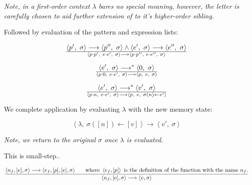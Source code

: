 \emph{Note, in a first-order context $\lambda$ bares no special meaning,
however, the letter is carefully chosen to aid further extension of  to
it's higher-order sibling.}

Followed by evaluation of the pattern and expression lists:

\begin{equation}
{
\left\langle p',\ \sigma\right\rangle
\longrightarrow
\left\langle p'',\ \sigma\right\rangle
\wedge
\left\langle e',\ \sigma\right\rangle
\longrightarrow
\left\langle e'',\ \sigma\right\rangle
}\over{
\left\langle p\cdot p',\ e\cdot e',\ \sigma\right\rangle
\longrightarrow
\left\langle p\cdot p'',\ e\cdot e'',\ \sigma\right\rangle
}
\end{equation}

\begin{equation}
{
\left\langle e',\ \sigma\right\rangle
\longrightarrow^*
\left\langle 0,\ \sigma\right\rangle
}\over{
\left\langle p\cdot 0,\ e\cdot e',\ \sigma\right\rangle
\longrightarrow
\left\langle p,\ e,\ \sigma\right\rangle
}
\end{equation}

\begin{equation}
{
\left\langle e',\ \sigma\right\rangle
\longrightarrow^*
\left\langle v',\ \sigma\right\rangle
}\over{
\left\langle p\cdot n,\ e\cdot e',\ \sigma\right\rangle
\longrightarrow
\left\langle p,\ e,\ \sigma(n)\leftarrow v' \right\rangle
}
\end{equation}




We complete application by evaluating $\lambda$ with the new memory state:

\begin{equation}
\left\langle \lambda,\ \sigma([n])\leftarrow[v]\right\rangle
\longrightarrow
\left\langle v',\ \sigma\right\rangle
\end{equation}

\emph{Note, we return to the original $\sigma$ once $\lambda$ is evaluated.}

\newpage

This is small-step..

\begin{equation}
{
\left\langle n_f, [e], \sigma\right\rangle
\longrightarrow
\left\langle e_f, [p], [e], \sigma\right\rangle
\ \ \ \ \ \text{where}\ \left\langle e_f, [p] \right\rangle
\ \text{is the definition of the function with the name}\ n_f\text{.}
\over
\left\langle n_f, [e], \sigma\right\rangle
\longrightarrow
\left\langle v, \sigma\right\rangle
}
\end{equation}

